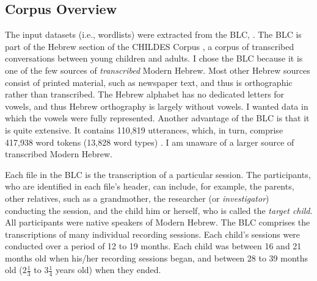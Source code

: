 \subsection{Corpus Overview}
\label{sec:corpus-overview}
The input datasets (i.e., wordlists) were extracted 
from the BLC, \citep{berman-weissenborn:1991}. 
The BLC is part of the Hebrew section of the 
CHILDES Corpus \citep{macwhinney:2000a}, a corpus 
of transcribed conversations between young children 
and adults. I chose the BLC because 
it is one of the few sources of \emph{transcribed} Modern Hebrew. 
Most other Hebrew sources consist of printed material, 
such as newspaper text, and thus is orthographic 
rather than transcribed. The Hebrew alphabet has no 
dedicated letters for vowels, and thus Hebrew 
orthography is largely without vowels. I wanted data in which the vowels were 
fully represented. Another advantage of the BLC is that 
it is quite extensive. It contains 110,819 utterances, which, in turn, comprise 417,938 word tokens (13,828 word types) \citep{albert-et-al:2012}.
I am unaware of a larger source of 
transcribed Modern Hebrew. 

Each file in the BLC is the transcription of a 
particular session. The participants, who are identified 
in each file's header, can include, for example, the parents,
 other relatives, such as a grandmother, 
the researcher (or \emph{investigator}) conducting the 
session, and the child him or herself, 
who is called the \emph{target child}. All participants 
were native speakers of Modern Hebrew. The BLC comprises 
the transcriptions of many individual recording sessions. 
Each child's sessions were conducted over a period of 
12 to 19 months. Each child was between 16 and 21 months 
old when his/her recording sessions began, and between 
28 to 39 months old ($2\frac{1}{3}$ to $3\frac{1}{4}$ 
years old) when they ended.

